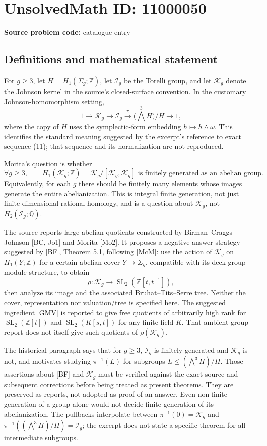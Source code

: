 \documentclass[11pt]{article}
\newcommand{\Z}{\mathbb{Z}}
\newcommand{\Q}{\mathbb{Q}}
\begin{document}
\section*{UnsolvedMath ID: 11000050}
\textbf{Source problem code:} catalogue entry
\subsection{Definitions and mathematical statement}
For \(g\geq3\), let \(H=H_1(\Sigma_g;\Z)\), let \(\mathcal I_g\) be the Torelli group, and let \(\mathcal K_g\) denote the Johnson kernel in the source's closed-surface convention. In the customary Johnson-homomorphism setting,
\[1\longrightarrow\mathcal K_g\longrightarrow\mathcal I_g
\xrightarrow{\pi}\bigl(\textstyle\bigwedge^3 H\bigr)/H\longrightarrow1,\]
where the copy of \(H\) uses the symplectic-form embedding \(h\mapsto h\wedge\omega\). This identifies the standard meaning suggested by the excerpt's reference to exact sequence (11); that sequence and its normalization are not reproduced.

Morita's question is whether
\[\forall g\geq3,\qquad H_1(\mathcal K_g;\Z)=\mathcal K_g/[\mathcal K_g,\mathcal K_g]\text{ is finitely generated as an abelian group}.\]
Equivalently, for each \(g\) there should be finitely many elements whose images generate the entire abelianization. This is integral finite generation, not just finite-dimensional rational homology, and is a question about \(\mathcal K_g\), not \(H_2(\mathcal I_g;\Q)\).

The source reports large abelian quotients constructed by Birman--Craggs--Johnson [BC, Jo1] and Morita [Mo2]. It proposes a negative-answer strategy suggested by [BF], Theorem 5.1, following [McM]: use the action of \(\mathcal K_g\) on \(H_1(Y;\Z)\) for a certain abelian cover \(Y\to\Sigma_g\), compatible with its deck-group module structure, to obtain
\[\rho:\mathcal K_g\to\operatorname{SL}_2(\Z[t,t^{-1}]),\]
then analyze its image and the associated Bruhat--Tits--Serre tree. Neither the cover, representation nor valuation/tree is specified here. The suggested ingredient [GMV] is reported to give free quotients of arbitrarily high rank for \(\operatorname{SL}_2(\Z[t])\) and \(\operatorname{SL}_2(K[s,t])\) for any finite field \(K\). That ambient-group report does not itself give such quotients of \(\rho(\mathcal K_g)\).

The historical paragraph says that for \(g\geq3\), \(\mathcal I_g\) is finitely generated and \(\mathcal K_g\) is not, and motivates studying \(\pi^{-1}(L)\) for subgroups \(L\leq(\bigwedge^3H)/H\). Those assertions about [BF] and \(\mathcal K_g\) must be verified against the exact source and subsequent corrections before being treated as present theorems. They are preserved as reports, not adopted as proof of an answer. Even non-finite-generation of a group alone would not decide finite generation of its abelianization. The pullbacks interpolate between \(\pi^{-1}(0)=\mathcal K_g\) and \(\pi^{-1}((\bigwedge^3H)/H)=\mathcal I_g\); the excerpt does not state a specific theorem for all intermediate subgroups.
\end{document}
